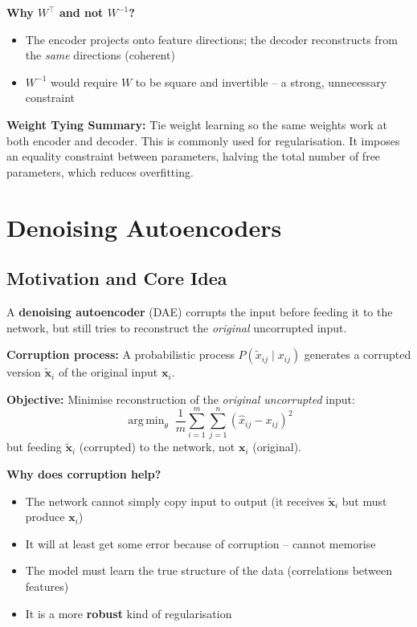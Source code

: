 \documentclass[12pt,a4paper]{article}
\newcommand{\vx}{\mathbf{x}}
\DeclareMathOperator*{\argmin}{arg\,min}
\begin{document}
\textbf{Why $W^\top$ and not $W^{-1}$?}
\begin{itemize}
  \item The encoder projects onto feature directions; the decoder reconstructs from the \emph{same} directions (coherent)
  \item $W^{-1}$ would require $W$ to be square and invertible -- a strong, unnecessary constraint
\end{itemize}

\begin{alertbox}
\textbf{Weight Tying Summary:} Tie weight learning so the same weights work at both encoder and decoder. This is commonly used for regularisation. It imposes an equality constraint between parameters, halving the total number of free parameters, which reduces overfitting.
\end{alertbox}

\section{Denoising Autoencoders}

\subsection{Motivation and Core Idea}

A \textbf{denoising autoencoder} (DAE) corrupts the input before feeding it to the network, but still tries to reconstruct the \emph{original} uncorrupted input.

\textbf{Corruption process:} A probabilistic process $P(\tilde{x}_{ij} \mid x_{ij})$ generates a corrupted version $\tilde{\vx}_i$ of the original input $\vx_i$.

\textbf{Objective:} Minimise reconstruction of the \emph{original uncorrupted} input:
\[
\argmin_{\theta}\;\frac{1}{m}\sum_{i=1}^{m}\sum_{j=1}^{n}(\hat{x}_{ij} - x_{ij})^2
\]
but feeding $\tilde{\vx}_i$ (corrupted) to the network, not $\vx_i$ (original).

\begin{keybox}
\textbf{Why does corruption help?}
\begin{itemize}
  \item The network cannot simply copy input to output (it receives $\tilde{\vx}_i$ but must produce $\vx_i$)
  \item It will at least get some error because of corruption -- cannot memorise
  \item The model must learn the true structure of the data (correlations between features)
  \item It is a more \textbf{robust} kind of regularisation
\end{itemize}
\end{keybox}
\end{document}
